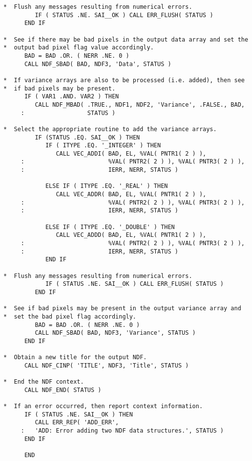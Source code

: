 \documentclass[twoside,11pt]{article}
\begin{document}
\begin{verbatim}
*  Flush any messages resulting from numerical errors.
         IF ( STATUS .NE. SAI__OK ) CALL ERR_FLUSH( STATUS )
      END IF

*  See if there may be bad pixels in the output data array and set the
*  output bad pixel flag value accordingly.
      BAD = BAD .OR. ( NERR .NE. 0 )
      CALL NDF_SBAD( BAD, NDF3, 'Data', STATUS )

*  If variance arrays are also to be processed (i.e. added), then see
*  if bad pixels may be present.
      IF ( VAR1 .AND. VAR2 ) THEN
         CALL NDF_MBAD( .TRUE., NDF1, NDF2, 'Variance', .FALSE., BAD,
     :                  STATUS )

*  Select the appropriate routine to add the variance arrays.
         IF (STATUS .EQ. SAI__OK ) THEN
            IF ( ITYPE .EQ. '_INTEGER' ) THEN
               CALL VEC_ADDI( BAD, EL, %VAL( PNTR1( 2 ) ),
     :                        %VAL( PNTR2( 2 ) ), %VAL( PNTR3( 2 ) ),
     :                        IERR, NERR, STATUS )

            ELSE IF ( ITYPE .EQ. '_REAL' ) THEN
               CALL VEC_ADDR( BAD, EL, %VAL( PNTR1( 2 ) ),
     :                        %VAL( PNTR2( 2 ) ), %VAL( PNTR3( 2 ) ),
     :                        IERR, NERR, STATUS )

            ELSE IF ( ITYPE .EQ. '_DOUBLE' ) THEN
               CALL VEC_ADDD( BAD, EL, %VAL( PNTR1( 2 ) ),
     :                        %VAL( PNTR2( 2 ) ), %VAL( PNTR3( 2 ) ),
     :                        IERR, NERR, STATUS )
            END IF

*  Flush any messages resulting from numerical errors.
            IF ( STATUS .NE. SAI__OK ) CALL ERR_FLUSH( STATUS )
         END IF

*  See if bad pixels may be present in the output variance array and
*  set the bad pixel flag accordingly.
         BAD = BAD .OR. ( NERR .NE. 0 )
         CALL NDF_SBAD( BAD, NDF3, 'Variance', STATUS )
      END IF

*  Obtain a new title for the output NDF.
      CALL NDF_CINP( 'TITLE', NDF3, 'Title', STATUS )
      
*  End the NDF context.
      CALL NDF_END( STATUS )

*  If an error occurred, then report context information.
      IF ( STATUS .NE. SAI__OK ) THEN
         CALL ERR_REP( 'ADD_ERR',
     :   'ADD: Error adding two NDF data structures.', STATUS )
      END IF

      END
\end{verbatim}
\normalsize
\end{document}
